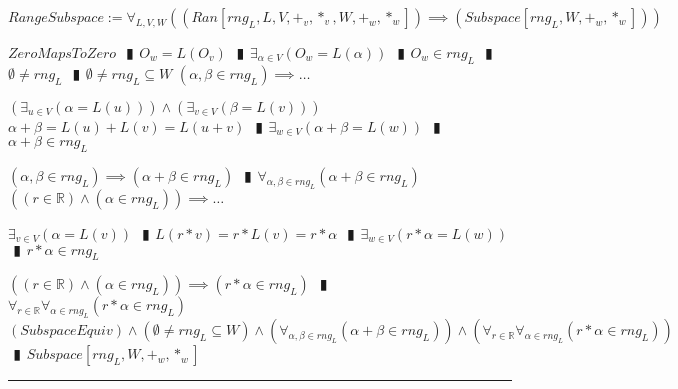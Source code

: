 \documentclass{book}
\newcommand{\abr}{:=}
\newcommand{\pipe}{$\phantom{(}\vrectangleblack\phantom{)}$}
\begin{document}
$RangeSubspace \abr \forall_{L, V, W}((Ran[rng_L, L, V, +_v, *_v, W, +_w, *_w]) \implies (Subspace[rng_L, W, +_w, *_w]))$
\begin{enumerate}
  \lit $ZeroMapsToZero$ \pipe $O_w = L(O_v)$ \pipe $\exists_{\alpha \in V}(O_w = L(\alpha))$ \pipe $O_w \in rng_L$ \pipe $\emptyset \neq rng_L$ \pipe $\emptyset \neq rng_L \subseteq W$
  \lit $(\alpha, \beta \in rng_L) \implies \ldots$
  \begin{enumerate}
    \lit $(\exists_{u \in V}(\alpha = L(u))) \land (\exists_{v \in V}(\beta = L(v)))$
    \lit $\alpha + \beta = L(u) + L(v) = L(u + v)$ \pipe $\exists_{w \in V}(\alpha + \beta = L(w))$ \pipe $\alpha + \beta \in rng_L$
  \end{enumerate}
  \lit $(\alpha, \beta \in rng_L) \implies (\alpha + \beta \in rng_L)$ \pipe $\forall_{\alpha, \beta \in rng_L}(\alpha + \beta \in rng_L)$
  \lit $((r \in \mathbb{R}) \land (\alpha \in rng_L)) \implies \ldots$
  \begin{enumerate}
    \lit $\exists_{v \in V}(\alpha = L(v))$ \pipe $L(r * v) = r * L(v) = r * \alpha$ \pipe $\exists_{w \in V}(r * \alpha = L(w))$ \pipe $r * \alpha \in rng_L$
  \end{enumerate}
  \lit $((r \in \mathbb{R}) \land (\alpha \in rng_L)) \implies (r * \alpha \in rng_L)$ \pipe $\forall_{r \in \mathbb{R}} \forall_{\alpha \in rng_L}(r * \alpha \in rng_L)$
  \lit $(SubspaceEquiv) \land (\emptyset \neq rng_L \subseteq W) \land (\forall_{\alpha, \beta \in rng_L}(\alpha + \beta \in rng_L)) \land (\forall_{r \in \mathbb{R}} \forall_{\alpha \in rng_L}(r * \alpha \in rng_L))$ \pipe $Subspace[rng_L, W, +_w, *_w]$
\end{enumerate} \vspace{.75mm} \hrule \vspace{.75mm} \ \\ 
\end{document}
